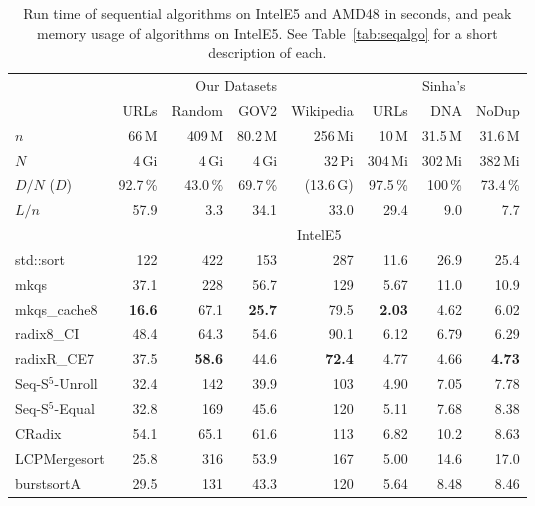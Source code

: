 \documentclass[a4paper]{myjournal}
\begin{document}
\begin{table}[p]\centering\small
\caption{Run time of sequential algorithms on IntelE5 and AMD48 in seconds, and peak memory usage of algorithms on IntelE5. See Table~\ref{tab:seqalgo} for a short description of each.}\label{tab:seqalgo-results1}
\def\tabcolsep{6pt}
\begin{tabular}{l|rrrr*{3}{r}|}
                    & \multicolumn{4}{c|}{Our Datasets} & \multicolumn{3}{c|}{Sinha's} \\
                    & URLs     & Random   & GOV2     & \multicolumn{1}{r|}{Wikipedia} & URLs     & DNA     & NoDup    \\ \hline
$n$                 & 66\,M    & 409\,M   & 80.2\,M  & 256\,Mi   & 10\,M    & 31.5\,M & 31.6\,M  \\
$N$                 & 4\,Gi    & 4\,Gi    & 4\,Gi    & 32\,Pi    & 304\,Mi  & 302\,Mi & 382\,Mi  \\
$D / N$ ($D$)       & 92.7\,\% & 43.0\,\% & 69.7\,\% & (13.6\,G) & 97.5\,\% & 100\,\% & 73.4\,\% \\
$L / n$             & 57.9     & 3.3      & 34.1     & 33.0      & 29.4     & 9.0     & 7.7      \\ \hline
& \multicolumn{7}{c|}{IntelE5} \\ \cline{2-8}
std::sort &      122 &      422 &      153 &      287 &     11.6 &     26.9 &     25.4 \\
            mkqs &     37.1 &      228 &     56.7 &      129 &     5.67 &     11.0 &     10.9 \\
    mkqs\_cache8 & \bf 16.6 &     67.1 & \bf 25.7 &     79.5 & \bf 2.03 &     4.62 &     6.02 \\
      radix8\_CI &     48.4 &     64.3 &     54.6 &     90.1 &     6.12 &     6.79 &     6.29 \\
     radixR\_CE7 &     37.5 & \bf 58.6 &     44.6 & \bf 72.4 &     4.77 &     4.66 & \bf 4.73 \\
Seq-S$^5$-Unroll &     32.4 &      142 &     39.9 &      103 &     4.90 &     7.05 &     7.78 \\
 Seq-S$^5$-Equal &     32.8 &      169 &     45.6 &      120 &     5.11 &     7.68 &     8.38 \\
          CRadix &     54.1 &     65.1 &     61.6 &      113 &     6.82 &     10.2 &     8.63 \\
    LCPMergesort &     25.8 &      316 &     53.9 &      167 &     5.00 &     14.6 &     17.0 \\
      burstsortA &     29.5 &      131 &     43.3 &      120 &     5.64 &     8.48 &     8.46 \\

\end{tabular}
\end{table}
\end{document}
